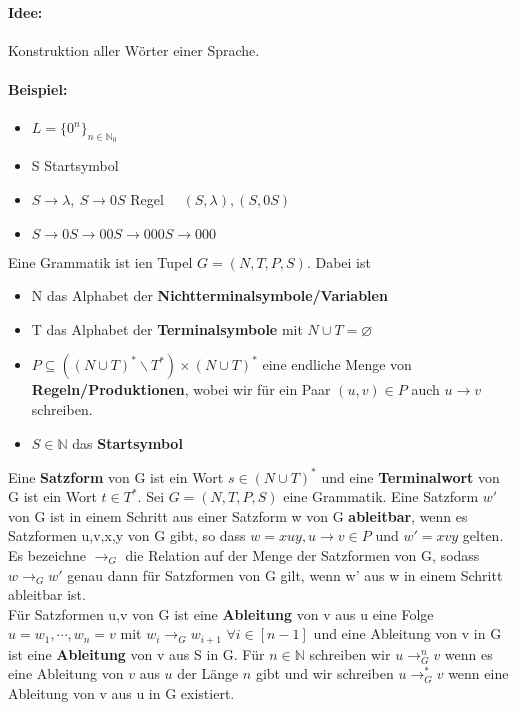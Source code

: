 \usetikzlibrary{trees}
\paragraph*{Idee:} Konstruktion aller Wörter einer Sprache.
\paragraph*{Beispiel:} 
\begin{itemize}
    \renewcommand{\labelitemi}{} %

    \item \(L=\{0^n\}_{n\in\mathbb{N}_0}\)
    \item S Startsymbol
    \item \(S\to \lambda, \ S\to 0S\) Regel \( \quad (S, \lambda), (S, 0S)\)
    \item \(S\to 0S\to 00S\to 000S\to 000\)


\end{itemize}
    Eine Grammatik ist ien Tupel \(G=(N,T,P,S)\). Dabei ist 
    \begin{itemize}
        \item N das Alphabet der \textbf{Nichtterminalsymbole/Variablen} 
        \item T das Alphabet der \textbf{Terminalsymbole} mit \(N\cup T=\varnothing \)
        \item \(P\subseteq((N\cup T)^*\backslash T^*)\times (N\cup T)^*\) eine endliche Menge von \textbf{Regeln/Produktionen}, wobei wir für ein Paar \((u, v) \in P\) auch \( u \to v\) schreiben.
        \item \(S\in\mathbb{N}\) das \textbf{Startsymbol}
    \end{itemize}
    Eine \textbf{Satzform} von G ist ein Wort \(s\in(N\cup T)^*\) und eine \textbf{Terminalwort} von G ist ein Wort \(t\in T^*\).
    Sei \(G=(N,T,P,S)\) eine Grammatik. Eine Satzform \(w'\) von G ist in einem Schritt aus einer Satzform w von G \textbf{ableitbar}, wenn es Satzformen u,v,x,y von G gibt, so dass \(w=xuy,u\to v\in P\) und \(w'=xvy\) gelten. Es bezeichne \(\to_G\) die Relation auf der Menge der Satzformen von G, sodass \(w\to_Gw'\) genau dann für Satzformen von G gilt, wenn w' aus w in einem Schritt ableitbar ist.\\
    Für Satzformen u,v von G ist eine \textbf{Ableitung} von v aus u eine Folge \(u=w_1,\cdots,w_n=v\) mit \(w_i\to_Gw_{i+1}\) \(\forall i\in[n-1]\) und eine Ableitung von v in G ist eine \textbf{Ableitung} von v aus S in G. Für \(n\in\mathbb{N}\) schreiben wir \(u\to^n_Gv\) wenn es eine Ableitung von $v$ aus $u$ der Länge $n$ gibt und wir schreiben \(u\to^*_Gv\) wenn eine Ableitung von v aus u in G existiert.
